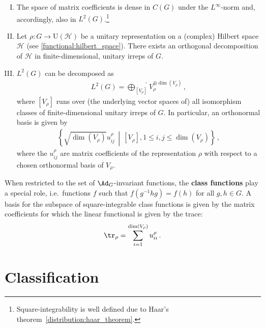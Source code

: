     \begin{theorem}\label{rep:peter_weyl}$ $
        \begin{enumerate}[I)]
            \item The space of matrix coefficients is dense in $C(G)$ under the $L^\infty$-norm and, accordingly, also in $L^2(G)$.\footnote{Square-integrability is well defined due to Haar's theorem~\ref{distribution:haar_theorem}.}
            \item Let $\rho:G\rightarrow\mathrm{U}(\mathcal{H})$ be a unitary representation on a (complex) Hilbert space $\mathcal{H}$ (see \cref{functional:hilbert_space}). There exists an orthogonal decomposition of $\mathcal{H}$ in finite-dimensional, unitary irreps of $G$.
            \item $L^2(G)$ can be decomposed as
            \begin{gather}
                L^2(G) = \widehat{\bigoplus_{[V_\rho]}}V_\rho^{\oplus\dim(V_\rho)}\,,
            \end{gather}
            where $[V_\rho]$ runs over (the underlying vector spaces of) all isomorphism classes of finite-dimensional unitary irreps of $G$. In particular, an orthonormal basis is given by
            \begin{gather}
                \left\{\sqrt{\dim(V_\rho)}u_{ij}^\rho\,\middle\vert\,[V_\rho],1\leq i,j\leq\dim(V_\rho)\right\}\,,
            \end{gather}
            where the $u_{ij}^\rho$ are matrix coefficients of the representation $\rho$ with respect to a chosen orthonormal basis of $V_\rho$.
        \end{enumerate}
    \end{theorem}

    \begin{result}
        When restricted to the set of $\Ad_G$-invariant functions, the \textbf{class functions} play a special role, i.e.~functions $f$ such that $f(g^{-1}hg)=f(h)$ for all $g,h\in G$. A basis for the subspace of square-integrable class functions is given by the matrix coefficients for which the linear functional is given by the trace:
        \begin{gather}
            \tr_\rho = \sum_{i=1}^{\dim(V_\rho)}u^\rho_{ii}\,.
        \end{gather}
    \end{result}

\section{Classification}

